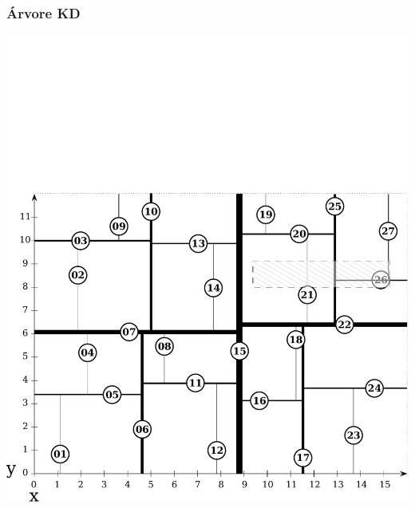 \documentclass[10pt,xcolor=table,fleqn]{beamer}
\begin{document}
\begin{frame}
  \frametitle{Árvore KD}
  \begin{center}
    \includegraphics[scale=0.3]{../img/points-query/kdt/points-kdt-model-0}
  \end{center}
\end{frame}
\end{document}
